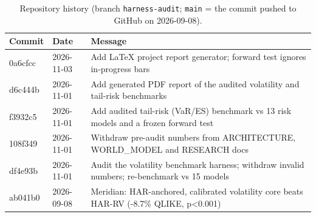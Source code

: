 \begin{table}[!htbp]
\centering
\footnotesize
\caption{Repository history (branch \texttt{harness-audit}; \texttt{main} = the commit pushed to GitHub on 2026-09-08).}
\label{tab:commits}
\begin{tabularx}{\linewidth}{llX}
\toprule
\textbf{Commit} & \textbf{Date} & \textbf{Message} \\
\midrule
0a6cfcc & 2026-11-03 & Add LaTeX project report generator; forward test ignores in-progress bars \\
d6c444b & 2026-11-01 & Add generated PDF report of the audited volatility and tail-risk benchmarks \\
f3932c5 & 2026-11-01 & Add audited tail-risk (VaR/ES) benchmark vs 13 risk models and a frozen forward test \\
108f349 & 2026-11-01 & Withdraw pre-audit numbers from ARCHITECTURE, WORLD\_MODEL and RESEARCH docs \\
df4e93b & 2026-11-01 & Audit the volatility benchmark harness; withdraw invalid numbers; re-benchmark vs 15 models \\
ab041b0 & 2026-09-08 & Meridian: HAR-anchored, calibrated volatility core beats HAR-RV (-8.7\% QLIKE, p<0.001) \\
\bottomrule
\end{tabularx}
\end{table}
